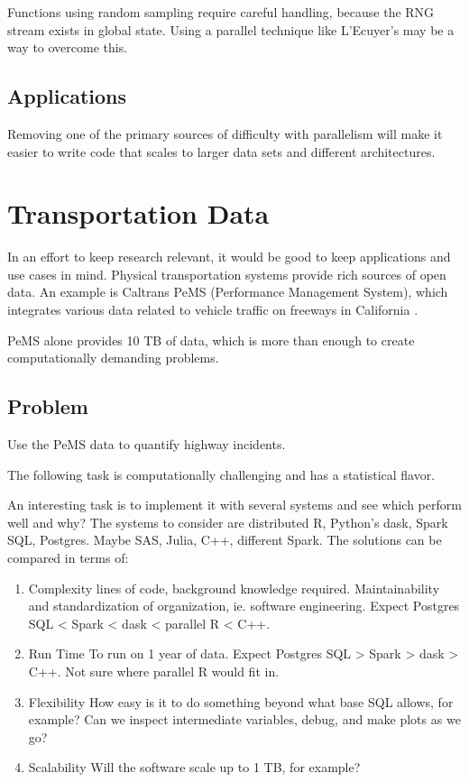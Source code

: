 \documentclass[12pt]{article}
\begin{document}
Functions using random sampling require careful handling, because the RNG
stream exists in global state. Using a parallel technique like L'Ecuyer's
may be a way to overcome this.

\subsection{Applications}

Removing one of the primary sources of difficulty with parallelism will
make it easier to write code that scales to larger data sets and different
architectures.

\section{Transportation Data}

In an effort to keep research relevant, it would be good to keep
applications and use cases in mind. Physical transportation systems provide
rich sources of open data. An example is Caltrans PeMS (Performance
Management System), which integrates various data related to vehicle
traffic on freeways in California \cite{jia2001pems}.

PeMS alone provides 10 TB of data, which is more than enough to create
computationally demanding problems.

\subsection{Problem}

Use the PeMS data to quantify highway incidents.

The following task is computationally challenging and has a statistical
flavor.


An interesting task is to implement it with several systems and see which
perform well and why? The systems to consider are distributed R, Python's
dask, Spark SQL, Postgres. Maybe SAS, Julia, C++, different Spark. The solutions can be compared in terms
of:
\begin{enumerate}
    \item{Complexity} lines of code, background knowledge required.
        Maintainability and standardization of organization, ie. software
        engineering.
        Expect Postgres SQL < Spark < dask < parallel R < C++.
    \item{Run Time} To run on 1 year of data.
        Expect Postgres SQL > Spark > dask > C++. Not sure where parallel R
        would fit in.
    \item{Flexibility} How easy is it to do something beyond what base SQL
        allows, for example? Can we inspect intermediate variables, debug,
        and make plots as we go?
    \item{Scalability} Will the software scale up to 1 TB, for example?
\end{enumerate}
\end{document}
